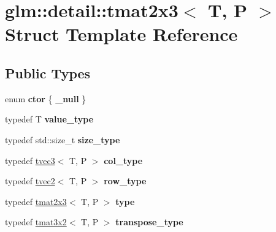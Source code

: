 \hypertarget{structglm_1_1detail_1_1tmat2x3}{\section{glm\-:\-:detail\-:\-:tmat2x3$<$ T, P $>$ Struct Template Reference}
\label{structglm_1_1detail_1_1tmat2x3}
}
\subsection*{Public Types}
\begin{DoxyCompactItemize}
\item 
enum {\bfseries ctor} \{ {\bfseries \-\_\-null}
 \}
\item 
\hypertarget{structglm_1_1detail_1_1tmat2x3_a956bc7b781faea2cf8a47f9150e035f4}{typedef T {\bfseries value\-\_\-type}}\label{structglm_1_1detail_1_1tmat2x3_a956bc7b781faea2cf8a47f9150e035f4}

\item 
\hypertarget{structglm_1_1detail_1_1tmat2x3_ab27aa4557eb2ffaf9931bcee48823cde}{typedef std\-::size\-\_\-t {\bfseries size\-\_\-type}}\label{structglm_1_1detail_1_1tmat2x3_ab27aa4557eb2ffaf9931bcee48823cde}

\item 
\hypertarget{structglm_1_1detail_1_1tmat2x3_aa68634b0c048f0010844a45aa5e9bdab}{typedef \hyperlink{structglm_1_1detail_1_1tvec3}{tvec3}$<$ T, P $>$ {\bfseries col\-\_\-type}}\label{structglm_1_1detail_1_1tmat2x3_aa68634b0c048f0010844a45aa5e9bdab}

\item 
\hypertarget{structglm_1_1detail_1_1tmat2x3_ae86cbe307097a27d0d6965b41e8f7ae3}{typedef \hyperlink{structglm_1_1detail_1_1tvec2}{tvec2}$<$ T, P $>$ {\bfseries row\-\_\-type}}\label{structglm_1_1detail_1_1tmat2x3_ae86cbe307097a27d0d6965b41e8f7ae3}

\item 
\hypertarget{structglm_1_1detail_1_1tmat2x3_ac22545a54f77e4e0915042109672179f}{typedef \hyperlink{structglm_1_1detail_1_1tmat2x3}{tmat2x3}$<$ T, P $>$ {\bfseries type}}\label{structglm_1_1detail_1_1tmat2x3_ac22545a54f77e4e0915042109672179f}

\item 
\hypertarget{structglm_1_1detail_1_1tmat2x3_aba2a62afb75e30c53886be45955591ae}{typedef \hyperlink{structglm_1_1detail_1_1tmat3x2}{tmat3x2}$<$ T, P $>$ {\bfseries transpose\-\_\-type}}\label{structglm_1_1detail_1_1tmat2x3_aba2a62afb75e30c53886be45955591ae}

\end{DoxyCompactItemize}
